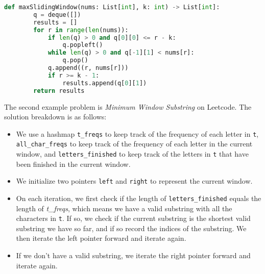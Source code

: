 \begin{lstlisting}[language=Python, caption=Sliding Window Maximum]
    def maxSlidingWindow(nums: List[int], k: int) -> List[int]:
        q = deque([])
        results = []
        for r in range(len(nums)):
            if len(q) > 0 and q[0][0] <= r - k:
                q.popleft()
            while len(q) > 0 and q[-1][1] < nums[r]:
                q.pop() 
            q.append((r, nums[r]))
            if r >= k - 1:
                results.append(q[0][1])
        return results
\end{lstlisting}

The second example problem is \textit{Minimum Window Substring} on Leetcode. The solution breakdown is as follows:
\begin{itemize}
    \item We use a hashmap \texttt{t\_freqs} to keep track of the frequency of each letter in \texttt{t}, 
          \texttt{all\_char\_freqs} to keep track of the frequency of each letter in the current window, 
          and \texttt{letters\_finished} to keep track of the letters in \texttt{t} that have been finished in the current window.
    \item We initialize two pointers \texttt{left} and \texttt{right} to represent the current window.
    \item On each iteration, we first check if the length of \texttt{letters\_finished} equals the length of \textit{t\_freqs}, 
          which means we have a valid substring with all the characters in \texttt{t}. If so, we check if the current substring is the 
          shortest valid substring we have so far, and if so record the indices of the substring. We then iterate the left pointer
          forward and iterate again.
    \item If we don't have a valid substring, we iterate the right pointer forward and iterate again.
\end{itemize}

